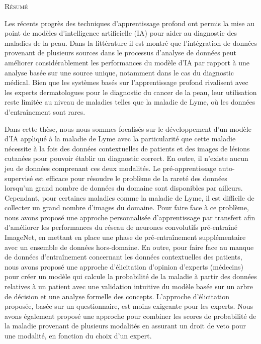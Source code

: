 \begin{center}
	\textsc{Résumé}
\end{center}
%
\noindent
%
Les récents progrès des techniques d'apprentissage profond ont permis la mise au point de modèles d'intelligence artificielle (IA) pour aider au diagnostic des maladies de la peau. Dans la littérature il est montré que l'intégration de données provenant de plusieurs sources dans le processus d'analyse de données peut améliorer considérablement les performances du modèle d'IA par rapport à une analyse basée sur une source unique, notamment dans le cas du diagnostic médical. Bien que les systèmes basés sur l'apprentissage profond rivalisent avec les experts dermatologues pour le diagnostic du cancer de la peau, leur utilisation reste limitée au niveau de maladies telles que la maladie de Lyme, où les données d'entraînement sont rares.

Dans cette thèse, nous nous sommes focalisés sur le développement d’un modèle d’IA appliqué à la maladie de Lyme avec la particularité que cette maladie nécessite à la fois des données contextuelles de patients et des images de lésions cutanées pour pouvoir établir un diagnostic correct. En outre, il n'existe aucun jeu de données comprenant ces deux modalités. Le pré-apprentissage auto-supervisé est efficace pour résoudre le problème de la rareté des données lorsqu’un grand nombre de données du domaine  sont disponibles par ailleurs. Cependant, pour certaines maladies comme la maladie de Lyme, il est difficile de collecter un grand nombre d'images du domaine. Pour faire face à ce problème, nous avons proposé une approche personnalisée d'apprentissage par transfert afin d'améliorer les performances du réseau de neurones convolutifs pré-entraîné ImageNet, en mettant en place une phase de pré-entraînement supplémentaire avec un ensemble de données hors-domaine. En outre, pour faire face au manque de données d'entraînement concernant les données contextuelles des patients, nous avons proposé une approche d'élicitation d’opinion d'experts (médecins) pour créer un modèle qui calcule la probabilité de la maladie à partir des données relatives à un patient avec une validation intuitive du modèle basée sur un arbre de décision et une analyse formelle des concepts. L'approche d'élicitation proposée, basée sur un questionnaire, est moins exigeante pour les experts. Nous avons également proposé une approche pour combiner les scores de probabilité de la maladie provenant de plusieurs modalités en assurant un droit de veto pour une modalité, en fonction du choix d'un expert. 

